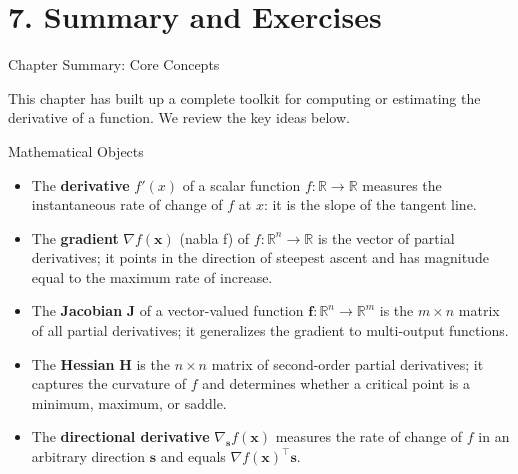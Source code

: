 \documentclass[aspectratio=169,10pt]{beamer}
\newcommand{\x}{\mathbf{x}}
\begin{document}
\section{7. Summary and Exercises}

\begin{frame}[allowframebreaks]{Chapter Summary: Core Concepts}

  This chapter has built up a complete toolkit for computing or estimating
  the derivative of a function.  We review the key ideas below.

  \begin{block}{Mathematical Objects}
    \begin{itemize}
      \item The \textbf{derivative} $f'(x)$ of a scalar function
            $f:\mathbb{R}\to\mathbb{R}$ measures the instantaneous rate of
            change of $f$ at $x$: it is the slope of the tangent line.
      \item The \textbf{gradient} $\nabla f(\x)$ (nabla f) of
            $f:\mathbb{R}^n\to\mathbb{R}$ is the vector of partial derivatives;
            it points in the direction of steepest ascent and has magnitude
            equal to the maximum rate of increase.
      \item The \textbf{Jacobian} $\mathbf{J}$ of a vector-valued function
            $\mathbf{f}:\mathbb{R}^n\to\mathbb{R}^m$ is the $m\times n$
            matrix of all partial derivatives; it generalizes the gradient to
            multi-output functions.
      \item The \textbf{Hessian} $\mathbf{H}$ is the $n\times n$ matrix of
            second-order partial derivatives; it captures the curvature of $f$
            and determines whether a critical point is a minimum, maximum, or
            saddle.
      \item The \textbf{directional derivative} $\nabla_\mathbf{s} f(\x)$
            measures the rate of change of $f$ in an arbitrary direction
            $\mathbf{s}$ and equals $\nabla f(\x)^\top \mathbf{s}$.
    \end{itemize}
  \end{block}

  \framebreak


\end{frame}
\end{document}
